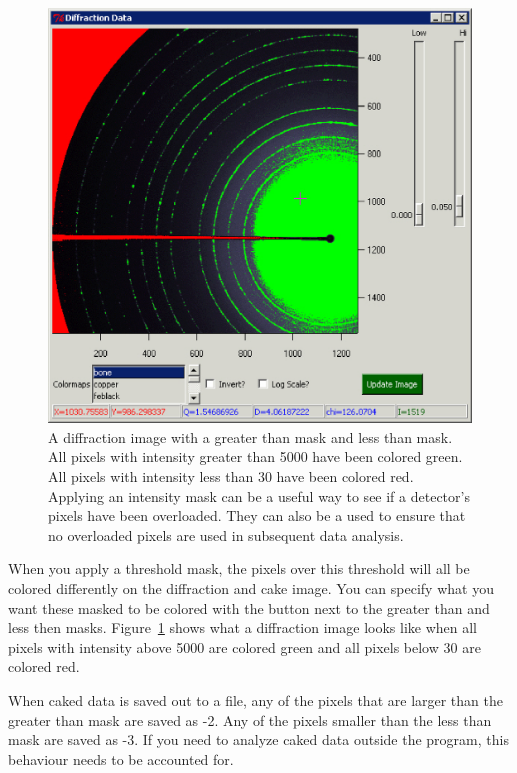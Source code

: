 \begin{figure}
    \centering
    \includegraphics[scale=.75]{figures/Threshold_Masking.eps}
    \caption{A diffraction image with a
    greater than mask and less than mask.
    All pixels with intensity greater than 5000 
    have been colored green. All pixels with 
    intensity less than 30 have been colored red. Applying
    an intensity mask can be a useful way to see if a detector's
    pixels have been overloaded. They can also be a used to
    ensure that no overloaded pixels are used in subsequent
    data analysis.}
    \label{Threshold_Masking}
\end{figure}

When you apply a threshold mask, the pixels over this threshold 
will all be colored differently on the diffraction and cake image. 
You can specify what you want these masked to be colored 
with the  button next to the greater 
than and less then masks. Figure~\ref{Threshold_Masking} shows 
what a diffraction image looks like when all pixels
with intensity above 5000 are colored green and all pixels 
below 30 are colored red.

When caked data is saved out to a file, any of the pixels 
that are larger than the greater than mask are saved 
as -2. Any of the pixels smaller than the less than mask
are saved as -3.  If you need to analyze caked data outside 
the program, this behaviour needs to be accounted for.

